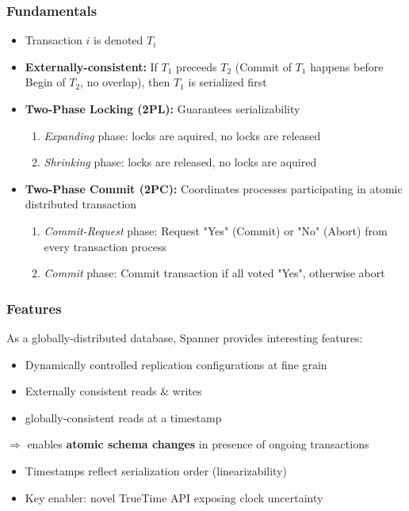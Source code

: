\documentclass{beamer}
\begin{document}
\begin{frame}
  \frametitle{Fundamentals}
  \begin{itemize}
    \item{Transaction $i$ is denoted $T_i$}
    \item{\textbf{Externally-consistent:} \newline
      If $T_1$ preceeds $T_2$ (Commit of $T_1$ happens before Begin of $T_2$, no
      overlap), then $T_1$ is serialized first
    }
    \pause
    \item{\textbf{Two-Phase Locking (2PL):} \newline
    Guarantees serializability
    \begin{enumerate}
      \item{\emph{Expanding} phase: locks are aquired, no locks are released}
      \item{\emph{Shrinking} phase: locks are released, no locks are aquired}
    \end{enumerate}
    }
    \item{\textbf{Two-Phase Commit (2PC):} \newline
    Coordinates processes participating in atomic distributed transaction
    \begin{enumerate}
      \item{\emph{Commit-Request} phase: Request "Yes" (Commit) or "No" (Abort) from
        every transaction process
      }
      \item{\emph{Commit} phase: Commit transaction if all voted "Yes", otherwise abort}
    \end{enumerate}
    }
  \end{itemize}
\end{frame}

\begin{frame}
  \frametitle{Features}
  As a globally-distributed database, Spanner provides interesting features:
  \begin{itemize}
    \item{Dynamically controlled replication configurations at fine grain}
    \item{Externally consistent reads \& writes}
    \item{globally-consistent reads at a timestamp}
  \end{itemize}
  $\Rightarrow$ enables \textbf{atomic schema changes} in presence of ongoing
  transactions \newline
  \pause
  \begin{itemize}
    \item{Timestamps reflect serialization order (linearizability)}
    \item{Key enabler: novel TrueTime API exposing clock uncertainty}
  \end{itemize}
\end{frame}
\end{document}
